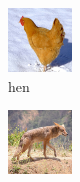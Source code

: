 \documentclass[10pt,twocolumn,letterpaper]{article}
\begin{document}
\begin{figure}
\begin{subfigure}[t]{0.3\linewidth}
        \includegraphics[width=\textwidth]{images/8.png}
        \caption*{hen}
    \end{subfigure}
    \begin{subfigure}[t]{0.3\linewidth}\centering
        \includegraphics[width=\textwidth]{images/271.png}

\end{subfigure}
\end{figure}
\end{document}
